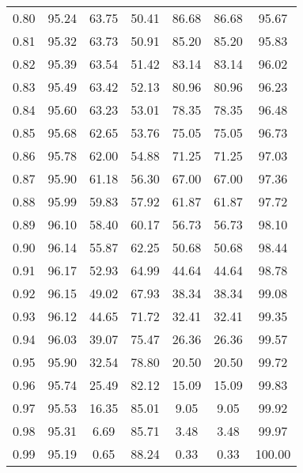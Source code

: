 \begin{tabular}{|c|c|c|c|c|c|c|}
      0.80 &     95.24 &     63.75 &      50.41 &   86.68 &      86.68 &         95.67 \\
      0.81 &     95.32 &     63.73 &      50.91 &   85.20 &      85.20 &         95.83 \\
      0.82 &     95.39 &     63.54 &      51.42 &   83.14 &      83.14 &         96.02 \\
      0.83 &     95.49 &     63.42 &      52.13 &   80.96 &      80.96 &         96.23 \\
      0.84 &     95.60 &     63.23 &      53.01 &   78.35 &      78.35 &         96.48 \\
      0.85 &     95.68 &     62.65 &      53.76 &   75.05 &      75.05 &         96.73 \\
      0.86 &     95.78 &     62.00 &      54.88 &   71.25 &      71.25 &         97.03 \\
      0.87 &     95.90 &     61.18 &      56.30 &   67.00 &      67.00 &         97.36 \\
      0.88 &     95.99 &     59.83 &      57.92 &   61.87 &      61.87 &         97.72 \\
      0.89 &     96.10 &     58.40 &      60.17 &   56.73 &      56.73 &         98.10 \\
      0.90 &     96.14 &     55.87 &      62.25 &   50.68 &      50.68 &         98.44 \\
      0.91 &     96.17 &     52.93 &      64.99 &   44.64 &      44.64 &         98.78 \\
      0.92 &     96.15 &     49.02 &      67.93 &   38.34 &      38.34 &         99.08 \\
      0.93 &     96.12 &     44.65 &      71.72 &   32.41 &      32.41 &         99.35 \\
      0.94 &     96.03 &     39.07 &      75.47 &   26.36 &      26.36 &         99.57 \\
      0.95 &     95.90 &     32.54 &      78.80 &   20.50 &      20.50 &         99.72 \\
      0.96 &     95.74 &     25.49 &      82.12 &   15.09 &      15.09 &         99.83 \\
      0.97 &     95.53 &     16.35 &      85.01 &    9.05 &       9.05 &         99.92 \\
      0.98 &     95.31 &      6.69 &      85.71 &    3.48 &       3.48 &         99.97 \\
      0.99 &     95.19 &      0.65 &      88.24 &    0.33 &       0.33 &        100.00 \\
\bottomrule
\end{tabular}
